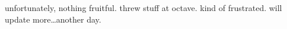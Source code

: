 unfortunately, nothing fruitful. threw stuff at octave. kind of frustrated.
will update more\ldots another day.
